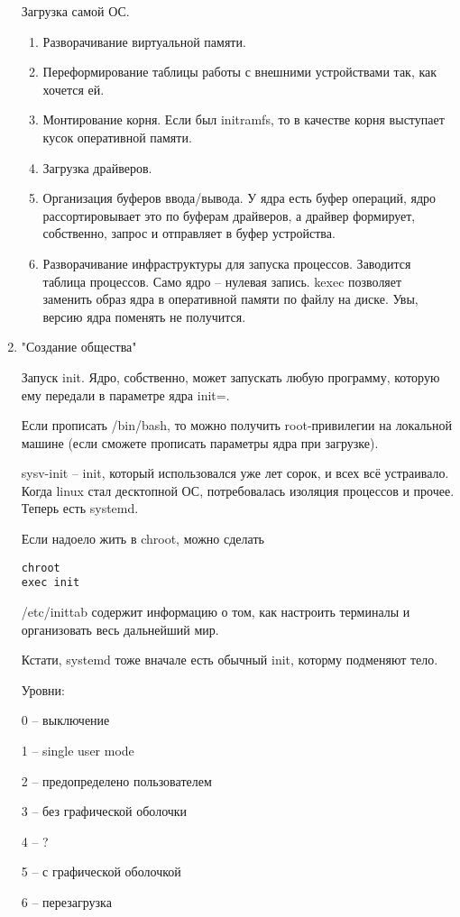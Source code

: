 \documentclass[a4paper,10pt]{article}
\begin{document}
\begin{enumerate}
Загрузка самой ОС.
\begin{enumerate}
\item Разворачивание виртуальной памяти.
\item Переформирование таблицы работы с внешними устройствами так, как хочется ей. 
\item Монтирование корня. Если был initramfs, то в качестве корня выступает кусок оперативной памяти.
\item Загрузка драйверов.
\item Организация буферов ввода/вывода. У ядра есть буфер операций, ядро рассортировывает это по буферам драйверов, а драйвер формирует, собственно, запрос и отправляет в буфер устройства.
\item Разворачивание инфраструктуры для запуска процессов. Заводится таблица процессов. Само ядро -- нулевая запись.
kexec позволяет заменить образ ядра в оперативной памяти по файлу на диске. Увы, версию ядра поменять не получится.
\end{enumerate}
\item "Создание общества"

Запуск init. Ядро, собственно, может запускать любую программу, которую ему передали в параметре ядра init=.

Если прописать /bin/bash, то можно получить root-привилегии на локальной машине (если сможете прописать параметры ядра при загрузке).

sysv-init -- init, который использовался уже лет сорок, и всех всё устраивало. Когда linux стал десктопной ОС, потребовалась изоляция процессов и прочее. Теперь есть systemd.

Если надоело жить в chroot, можно сделать 
\begin{verbatim}
chroot
exec init 
\end{verbatim}
/etc/inittab содержит информацию о том, как настроить терминалы и организовать весь дальнейший мир.

Кстати, systemd тоже вначале есть обычный init, которму подменяют тело.

Уровни:

0 -- выключение

1 -- single user mode

2 -- предопределено пользователем

3 -- без графической оболочки

4 -- ?

5 -- с графической оболочкой

6 -- перезагрузка


\end{enumerate}
\end{document}
